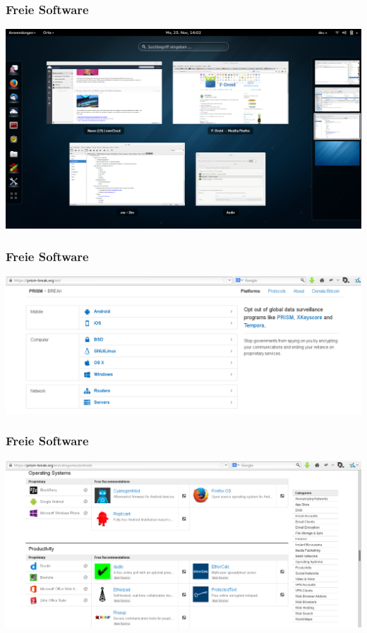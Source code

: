\documentclass[12pt]{beamer}
\begin{document}
\begin{frame}
    \frametitle{Freie Software}
    \includegraphics[height=0.7\textheight]{img/gnome.png}
\end{frame}

\begin{frame}
    \frametitle{Freie Software}
    \includegraphics[height=0.7\textheight]{img/prism-break1.png}
\end{frame}

\begin{frame}
    \frametitle{Freie Software}
    \includegraphics[height=0.7\textheight]{img/prism-break2.png}
\end{frame}
\end{document}
